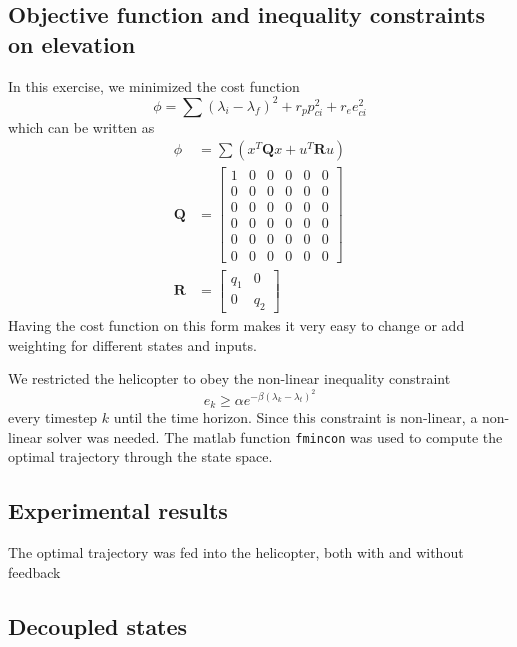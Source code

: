 \subsection{Objective function and inequality constraints on elevation}
In this exercise, we minimized the cost function
\begin{equation}
        \phi =\sum (\lambda_i - \lambda_f)^2 + r_{p}p_{ci}^2 + r_{e}e_{ci}^2
\end{equation}
which can be written as
\begin{subequations}
    \begin{align}
        \phi &= \sum(x^{T}\mathbf{Q}x+u^{T}\mathbf{R}u) \\
        \mathbf{Q} &= \begin{bmatrix}
        1 & 0 & 0 & 0 & 0 & 0         \\
        0 & 0 & 0 & 0 & 0 & 0         \\
        0 & 0 & 0 & 0 & 0 & 0         \\
        0 & 0 & 0 & 0 & 0 & 0         \\
        0 & 0 & 0 & 0 & 0 & 0         \\
        0 & 0 & 0 & 0 & 0 & 0
        \end{bmatrix}\\
        \mathbf{R} &= \begin{bmatrix}
            q_1        & 0        \\
            0          & q_2
        \end{bmatrix}
    \end{align}
\end{subequations}
Having the cost function on this form makes it very easy to change or add weighting for different states and inputs.

We restricted the helicopter to obey the non-linear inequality constraint
\begin{equation}
e_k \geq \alpha e^{-\beta(\lambda_k-\lambda_t)^{2}}
\end{equation}
every timestep $k$ until the time horizon.
Since this constraint is non-linear, a non-linear solver was needed. The matlab function \texttt{fmincon} was used to compute the optimal trajectory through the state space.



\subsection{Experimental results}
The optimal trajectory was fed into the helicopter, both with and without feedback


\subsection{Decoupled states}

